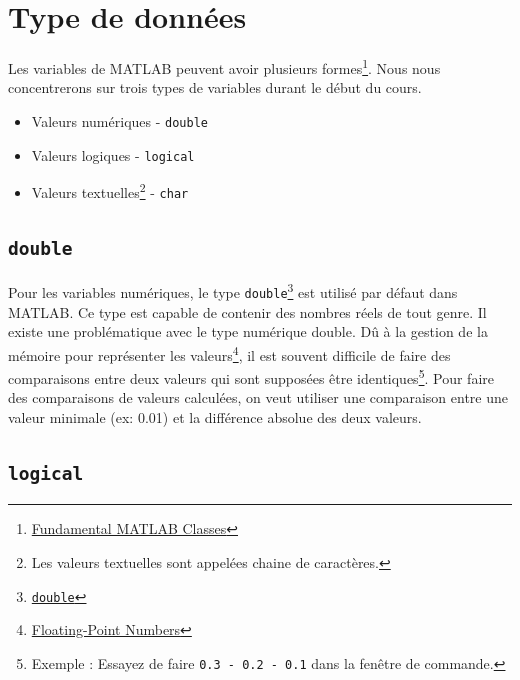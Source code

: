 \documentclass[]{tufte-handout}
\newcommand{\passthrough}[1]{#1}
\providecommand{\tightlist}{%
  \setlength{\itemsep}{0pt}\setlength{\parskip}{0pt}}
\begin{document}
\hypertarget{type-de-donnuxe9es}{%
\section{Type de données}\label{type-de-donnuxe9es}}

Les variables de MATLAB peuvent avoir plusieurs formes\footnote{\href{https://www.mathworks.com/help/matlab/matlab_prog/fundamental-matlab-classes.html}{Fundamental
  MATLAB Classes}}. Nous nous concentrerons sur trois types de variables
durant le début du cours.

\begin{itemize}
\tightlist
\item
  Valeurs numériques - \passthrough{\lstinline!double!}
\item
  Valeurs logiques - \passthrough{\lstinline!logical!}
\item
  Valeurs textuelles\footnote{Les valeurs textuelles sont appelées
    chaine de caractères.} - \passthrough{\lstinline!char!}
\end{itemize}

\hypertarget{double}{%
\subsection{\texorpdfstring{\texttt{double}}{double}}\label{double}}

Pour les variables numériques, le type
\passthrough{\lstinline!double!}\footnote{\href{https://www.mathworks.com/help/matlab/ref/double.html}{\passthrough{\lstinline!double!}}}
est utilisé par défaut dans MATLAB. Ce type est capable de contenir des
nombres réels de tout genre. Il existe une problématique avec le type
numérique double. Dû à la gestion de la mémoire pour représenter les
valeurs\footnote{\href{https://www.mathworks.com/help/matlab/matlab_prog/floating-point-numbers.html}{Floating-Point
  Numbers}}, il est souvent difficile de faire des comparaisons entre
deux valeurs qui sont supposées être identiques\footnote{Exemple :
  Essayez de faire \passthrough{\lstinline!0.3 - 0.2 - 0.1!} dans la
  fenêtre de commande.}. Pour faire des comparaisons de valeurs
calculées, on veut utiliser une comparaison entre une valeur minimale
(ex: 0.01) et la différence absolue des deux valeurs.

\hypertarget{logical}{%
\subsection{\texorpdfstring{\texttt{logical}}{logical}}\label{logical}}
\end{document}
